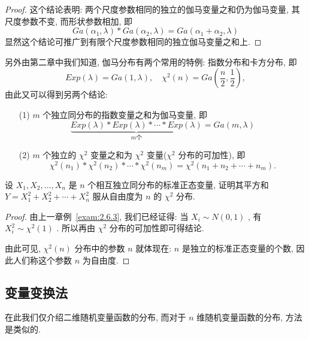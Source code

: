 \begin{example}[(伽玛分布的可加性)]
\begin{proof}
   		这个结论表明: 两个尺度参数相同的独立的伽马变量之和仍为伽马变量, 其尺度参数不变, 而形状参数相加, 即
   		\begin{equation}\label{eq:3.3.16}
   			Ga(\alpha_1,\lambda)\ast Ga(\alpha_2,\lambda)=Ga(\alpha_1+\alpha_2,\lambda)
   		\end{equation}
   		显然这个结论可推广到有限个尺度参数相同的独立伽马变量之和上.
   	\end{proof}
   	另外由第二章中我们知道, 伽马分布有两个常用的特例: 指数分布和卡方分布, 即
   	\begin{equation*}
   	Exp(\lambda)=Ga(1,\lambda),\quad\chi^2(n)=Ga\left( \frac{n}{2},\frac{1}{2}\right),
   	\end{equation*}
   	由此又可以得到另两个结论:
   	\begin{itemize}
   		\item[(1)] $m$ 个独立同分布的指数变量之和为伽马变量, 即
   		\begin{equation}\label{eq:3.3.17}
   		\underbrace{Exp(\lambda)\ast Exp(\lambda)\ast\cdots\ast Exp(\lambda)}_{m\text{个}}=Ga(m,\lambda)
   		\end{equation}
   		\item[(2)] $m$ 个独立的 $\chi^2$ 变量之和为 $\chi^2$ 变量($\chi^2$ 分布的可加性), 即
   		\begin{equation}\label{eq:3.3.18}
   		\chi^2(n_1)\ast\chi^2(n_2)\ast\cdots\ast\chi^2(n_m)=\chi^2(n_1+n_2+\cdots+n_m).
   		\end{equation}
   	\end{itemize}
   \end{example}
   \begin{example}
   	设 $X_1,X_2,\ldots,X_n$ 是 $n$ 个相互独立同分布的标准正态变量, 证明其平方和 $Y=X_1^2+X_2^2+\cdots+X_n^2$ 服从自由度为 $n$ 的 $\chi^2$ 分布.
   	\begin{proof}
   		由上一章例~\ref{exam:2.6.3}, 我们已经证得: 当 $X_i\sim N(0,1)$ , 有 $X_i^2\sim\chi^2(1)$ . 所以再由 $\chi^2$ 分布的可加性即可得结论.
   		
   		由此可见, $\chi^2(n)$ 分布中的参数 $n$ 就体现在: $n$ 是独立的标准正态变量的个数, 因此人们称这个参数 $n$ 为自由度.
   	\end{proof}
   \end{example}

    \subsection{变量变换法}\label{ssec:3.3.4}
    在此我们仅介绍二维随机变量函数的分布, 而对于 $n$ 维随机变量函数的分布, 方法是类似的.

